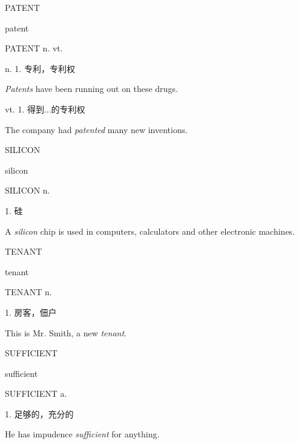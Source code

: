 \begin{flashcard}{
PATENT

patent
}
\begin{center}
PATENT n. vt. 
\end{center}
n. 1. 专利，专利权

\textit{Patents} have been running out on these drugs.

vt. 1. 得到...的专利权

The company had \textit{patented} many new inventions.

\end{flashcard}
\begin{flashcard}{
SILICON

silicon
}
\begin{center}
SILICON n. 
\end{center}
1. 硅

A \textit{silicon} chip is used in computers, calculators and other electronic machines.

\end{flashcard}
\begin{flashcard}{
TENANT

tenant
}
\begin{center}
TENANT n. 
\end{center}
1. 房客，佃户

This is Mr. Smith, a new \textit{tenant}.

\end{flashcard}
\begin{flashcard}{
SUFFICIENT

sufficient
}
\begin{center}
SUFFICIENT a. 
\end{center}
1. 足够的，充分的

He has impudence \textit{sufficient} for anything.

\end{flashcard}

